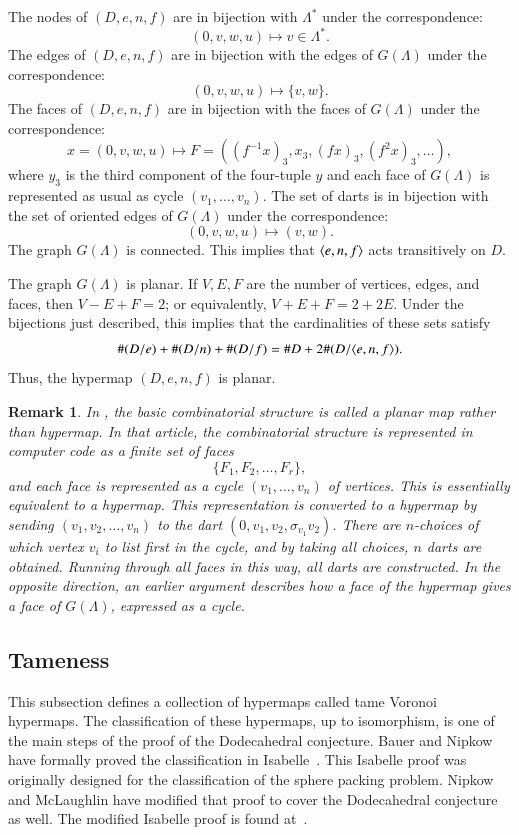 \documentclass{article} %
\newtheorem{remark}[lemma]{Remark}
\begin{document}
The nodes of $(D,e,n,f)$ are in bijection with $\Lambda^*$ under the correspondence:
$$
  (0,v,w,u) \mapsto v\in\Lambda^*.
$$
The edges of $(D,e,n,f)$ are in bijection with the edges of $G(\Lambda)$ under the
correspondence:
$$
  (0,v,w,u) \mapsto \{v,w\}.
$$
The faces of $(D,e,n,f)$ are in bijection with the faces of $G(\Lambda)$ under the
correspondence:
$$
  x = (0,v,w,u) \mapsto F=((f^{-1}x)_3,x_3,(f x)_3,(f^2 x)_3,\ldots),
$$
where $y_3$ is the third component of the four-tuple $y$ and each face of $G(\Lambda)$ is represented
as usual as cycle $(v_1,\ldots,v_n)$.
The set of darts is in bijection with the set of oriented edges of $G(\Lambda)$ under
the correspondence:
$$
(0,v,w,u)\mapsto (v,w).
$$
The graph $G(\Lambda)$ is connected.  This implies that $\langle e,n,f\rangle$ acts
transitively on $D$.

The graph $G(\Lambda)$ is planar.  If $V,E,F$ are the number of vertices, edges,
and faces, then $V-E+F=2$; or equivalently, $V+E+F = 2 + 2E$.
Under the bijections just described, this implies that the cardinalities
of these sets satisfy
$$
     \#(D/e) + \#(D/n) + \#(D/f) = \# D + 2\#(D/\langle e,n,f\rangle).
$$
Thus, the hypermap $(D,e,n,f)$ is planar.

\begin{remark}
In \cite{Hales:2002:Dodec}, the basic combinatorial structure is called a {\it planar map} rather
than hypermap.  In that article, the combinatorial structure is represented in
computer code as a finite set of faces
 $$
  \{F_1,F_2,\ldots,F_r\},
 $$
and each face is represented as a cycle $(v_1,\ldots,v_n)$ of vertices.  This is
essentially equivalent to a hypermap.  This representation
is converted to a hypermap by sending $(v_1,v_2,\ldots,v_n)$ to the dart
$(0,v_1,v_2,\sigma_{v_1} v_2)$.  There are $n$-choices of which vertex $v_i$ to list
first in the cycle, and by taking all choices, $n$ darts are obtained.  Running
through all faces in this way, all darts are constructed.  In the opposite direction,
an earlier argument describes how a face of the hypermap gives a face of $G(\Lambda)$,
expressed as a cycle.
\end{remark}

\subsection{Tameness}

This subsection defines a collection of hypermaps called tame Voronoi
hypermaps. The classification of these hypermaps, up to isomorphism,
is one of the main steps of the proof of the Dodecahedral conjecture.
Bauer and Nipkow have formally proved the classification in
Isabelle~\cite{Nipkow:2005:Tame}.  This Isabelle proof was originally
designed for the classification of the sphere packing problem. Nipkow
and McLaughlin have modified that proof to cover the Dodecahedral
conjecture as well. The modified Isabelle proof is found
at~\cite{McLaughlin:2008:KeplerCode}.
\end{document}
